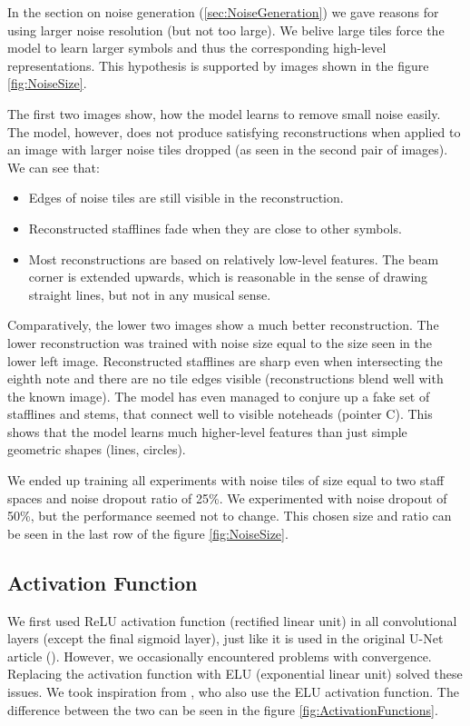 In the section on noise generation (\ref{sec:NoiseGeneration}) we gave reasons for using larger noise resolution (but not too large). We belive large tiles force the model to learn larger symbols and thus the corresponding high-level representations. This hypothesis is supported by images shown in the figure \ref{fig:NoiseSize}.

The first two images show, how the model learns to remove small noise easily. The model, however, does not produce satisfying reconstructions when applied to an image with larger noise tiles dropped (as seen in the second pair of images). We can see that:

\begin{itemize}
    \item Edges of noise tiles are still visible in the reconstruction.
    \item Reconstructed stafflines fade when they are close to other symbols.
    \item Most reconstructions are based on relatively low-level features. The beam corner is extended upwards, which is reasonable in the sense of drawing straight lines, but not in any musical sense.
\end{itemize}

Comparatively, the lower two images show a much better reconstruction. The lower reconstruction was trained with noise size equal to the size seen in the lower left image. Reconstructed stafflines are sharp even when intersecting the eighth note and there are no tile edges visible (reconstructions blend well with the known image). The model has even managed to conjure up a fake set of stafflines and stems, that connect well to visible noteheads (pointer C). This shows that the model learns much higher-level features than just simple geometric shapes (lines, circles).

We ended up training all experiments with noise tiles of size equal to two staff spaces and noise dropout ratio of 25\%. We experimented with noise dropout of 50\%, but the performance seemed not to change. This chosen size and ratio can be seen in the last row of the figure \ref{fig:NoiseSize}.


\subsection{Activation Function}
\label{sec:ActivationFunction}

We first used ReLU activation function (rectified linear unit) in all convolutional layers (except the final sigmoid layer), just like it is used in the original U-Net article (\cite{UNet}). However, we occasionally encountered problems with convergence. Replacing the activation function with ELU (exponential linear unit) solved these issues. We took inspiration from \cite{DorferEtAl}, who also use the ELU activation function. The difference between the two can be seen in the figure \ref{fig:ActivationFunctions}.

